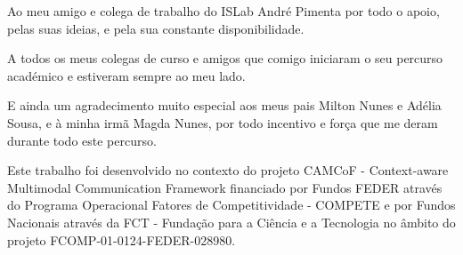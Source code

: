 \documentclass[a4paper, 12pt, oneside]{Thesis}  %
\begin{document}
Ao meu amigo e colega de trabalho do ISLab André Pimenta por todo o apoio, pelas suas ideias, e pela sua constante disponibilidade.

A todos os meus colegas de curso e amigos que comigo iniciaram o seu percurso académico e estiveram sempre ao meu lado.

E ainda um agradecimento muito especial aos meus pais Milton Nunes e Adélia Sousa, e à minha irmã Magda Nunes, por todo incentivo e força que me deram durante todo este percurso.

\newpage
\thispagestyle{empty}
\vspace*{\fill}

Este trabalho foi desenvolvido no contexto do projeto CAMCoF - Context-aware Multimodal Communication Framework financiado por Fundos FEDER através do Programa Operacional Fatores de Competitividade - COMPETE e por Fundos Nacionais através da FCT - Fundação para a Ciência e a Tecnologia no âmbito do projeto FCOMP-01-0124-FEDER-028980.\\
\end{document}

